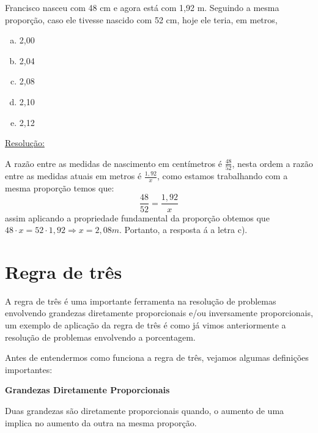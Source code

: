 \begin{exem}[VUNESP - 2012]
 Francisco nasceu com 48 cm e agora está com 1,92 m. Seguindo a mesma proporção, caso ele tivesse nascido com 52 cm, hoje ele teria, em metros,
 \begin{multicols}{5}
 \begin{enumerate}[a)]
  \item 2,00
  \item 2,04
  \item 2,08
  \item 2,10
  \item 2,12
 \end{enumerate}
 \end{multicols}

\underline{Resolução:}

A razão entre as medidas de nascimento em centímetros é $\frac{48}{52}$, nesta ordem a razão entre as medidas atuais em metros é $\frac{1,92}{x}$, como estamos trabalhando com a mesma proporção temos que:
\[\frac{48}{52} = \frac{1,92}{x}\]
assim aplicando a propriedade fundamental da proporção obtemos que $48 \cdot x= 52 \cdot 1,92 \Rightarrow x= 2,08 m$. Portanto, a resposta á a letra c).

\fim
\end{exem}


\chapter{Regra de três}

A regra de três é uma importante ferramenta na resolução de problemas envolvendo grandezas diretamente proporcionais e/ou inversamente proporcionais, um exemplo de aplicação da regra de três é como já vimos anteriormente a resolução de problemas envolvendo a porcentagem.

Antes de entendermos como funciona a regra de três, vejamos algumas definições importantes:

\vskip0.3cm

\colorbox{azul}{
 \begin{minipage}{14.5cm}
 \begin{center}
 \textbf{Grandezas Diretamente Proporcionais}

   Duas grandezas são diretamente proporcionais quando, o aumento de uma implica no aumento da outra na mesma proporção.
 \end{center}
 \end{minipage}}

 \vskip0.3cm

